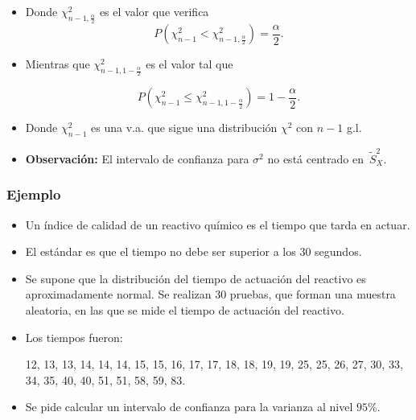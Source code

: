 \begin{frame}
\begin{itemize}
\item Donde $\chi_{n-1,\frac{\alpha}{2}}^2$ es el valor que verifica
$$P(\chi_{n-1}^2<\chi_{n-1,\frac{\alpha}{2}}^2)=\frac{\alpha}{2}.$$

\item Mientras que $\chi_{n-1,1-\frac{\alpha}{2}}^2$ es el valor tal que

       $$P(\chi_{n-1}^2\leq\chi_{n-1,1-\frac{\alpha}{2}}^2)=1-\frac{\alpha}{2}.$$

\item  Donde $\chi_{n-1}^2$ es  una v.a. que sigue una distribución $\chi^2$ con $n-1$ g.l.

\item \textbf{Observación:} El intervalo de confianza para $\sigma^2$ no está centrado en~$\tilde{S}_{X}^2$.
\end{itemize}
\end{frame}

\begin{frame}
 
\frametitle{Ejemplo}
\begin{itemize}
\item Un índice de calidad de un reactivo químico es el tiempo que tarda en actuar.
\item El estándar  es que el tiempo no debe ser superior a los 30 segundos.
\item Se supone que la distribución del tiempo de actuación del reactivo es aproximadamente normal. Se realizan
   30  pruebas, que forman una muestra aleatoria, en las que se mide el tiempo de actuación del reactivo.
\item  Los tiempos fueron:

12, 13, 13, 14, 14, 14, 15, 15, 16, 17, 17, 18, 18, 19, 19, 25, 25, 26, 27, 30, 33, 34, 35,
40, 40, 51, 51, 58, 59, 83.
\item Se pide calcular un intervalo de confianza para la varianza  al nivel $95\%$.
\end{itemize}
\end{frame}


